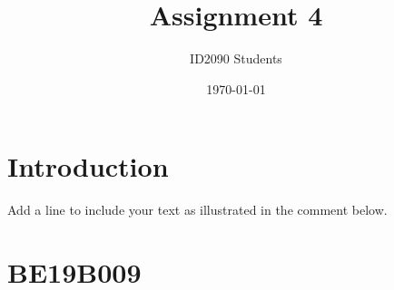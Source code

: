 \documentclass[a4paper, 12pt]{article}
\begin{document}
\title{Assignment 4}
\author{ID2090 Students}
\date{\today}
\maketitle

\tableofcontents

\section{Introduction}
Add a line to include your text as illustrated in the comment below.

\section{BE19B009}

\end{document}
